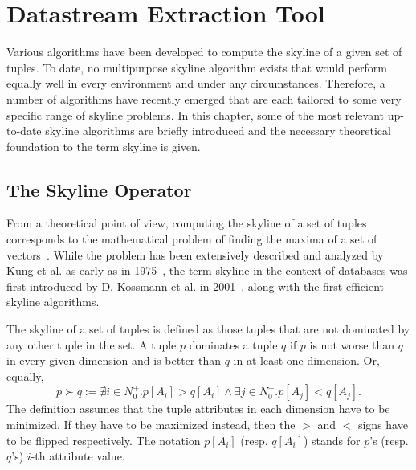 \chapter{Datastream Extraction Tool} \label{chapter:datastream-extraction-tool}
Various algorithms have been developed to compute the skyline of a given set of tuples. To date, no multipurpose skyline algorithm exists that would perform equally well in every environment and under any circumstances. Therefore, a number of algorithms have recently emerged that are each tailored to some very specific range of skyline problems. In this chapter, some of the most relevant up-to-date skyline algorithms are briefly introduced and the necessary theoretical foundation to the term skyline is given. 

\section{The Skyline Operator} \label{section:skyline-operator}
From a theoretical point of view, computing the skyline of a set of tuples corresponds to the mathematical problem of finding the maxima of a set of vectors~\cite{kung}. While the problem has been extensively described and analyzed by Kung et al. as early as in 1975~\cite{kung}, the term skyline in the context of databases was first introduced by D. Kossmann et al. in 2001~\cite{kossmann}, along with the first efficient skyline algorithms. 

The skyline of a set of tuples is defined as those tuples that are not dominated by any other tuple in the set. A tuple $p$ dominates a tuple $q$ if $p$ is not worse than $q$ in every given dimension and is better than $q$ in at least one dimension. Or, equally, 
\begin{equation}
p \succ q := \nexists i \in N^{+}_{0} . p[A_{i}] > q[A_{i}] \wedge \exists j \in N^{+}_{0} . p[A_{j}] < q[A_{j}]. 
\end{equation}
The definition assumes that the tuple attributes in each dimension have to be minimized. If they have to be maximized instead, then the $>$ and $<$ signs have to be flipped respectively. The notation $p[A_{i}]$ (resp. $q[A_{i}]$) stands for $p$'s (resp. $q$'s) $i$-th attribute value. 






